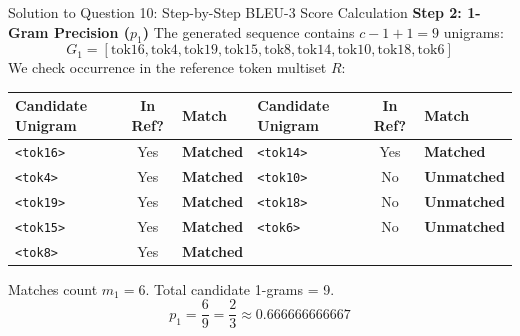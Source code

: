 \documentclass[11pt,a4paper]{article}
\begin{document}
\begin{solutionbox}{Solution to Question 10: Step-by-Step BLEU-3 Score Calculation}
\medskip
\noindent
\textbf{Step 2: 1-Gram Precision ($p_1$)}
The generated sequence contains $c - 1 + 1 = 9$ unigrams:
\begin{equation*}
    G_1 = [\text{tok16}, \text{tok4}, \text{tok19}, \text{tok15}, \text{tok8}, \text{tok14}, \text{tok10}, \text{tok18}, \text{tok6}]
\end{equation*}
We check occurrence in the reference token multiset $R$:
\begin{center}
\small
\setlength{\tabcolsep}{4pt}
\begin{tabular}{l c l | l c l}
\toprule
\textbf{Candidate Unigram} & \textbf{In Ref?} & \textbf{Match} & \textbf{Candidate Unigram} & \textbf{In Ref?} & \textbf{Match} \\
\midrule
\texttt{<tok16>} & Yes & \textcolor{accentgreen}{\textbf{Matched}} & \texttt{<tok14>} & Yes & \textcolor{accentgreen}{\textbf{Matched}} \\
\texttt{<tok4>}  & Yes & \textcolor{accentgreen}{\textbf{Matched}} & \texttt{<tok10>} & No  & \textcolor{accentred}{\textbf{Unmatched}} \\
\texttt{<tok19>} & Yes & \textcolor{accentgreen}{\textbf{Matched}} & \texttt{<tok18>} & No  & \textcolor{accentred}{\textbf{Unmatched}} \\
\texttt{<tok15>} & Yes & \textcolor{accentgreen}{\textbf{Matched}} & \texttt{<tok6>}  & No  & \textcolor{accentred}{\textbf{Unmatched}} \\
\texttt{<tok8>}  & Yes & \textcolor{accentgreen}{\textbf{Matched}} & & & \\
\bottomrule
\end{tabular}
\end{center}
Matches count $m_1 = 6$. Total candidate 1-grams = 9.
\begin{equation*}
    p_1 = \frac{6}{9} = \frac{2}{3} \approx \mathbf{0.666666666667}
\end{equation*}


\end{solutionbox}
\end{document}
